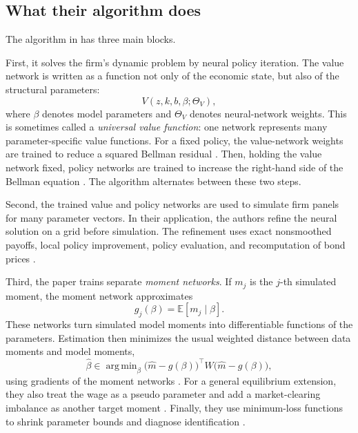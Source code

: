 \documentclass[11pt]{article}
\newcommand{\E}{\mathbb{E}}
\newcommand{\1}{\mathbf{1}}
\DeclareMathOperator*{\argmin}{arg\,min}
\begin{document}
\subsection{What their algorithm does}

The algorithm in \citet[Section 3]{duartefonseca2026ai} has three main blocks.

First, it solves the firm's dynamic problem by neural policy iteration. The
value network is written as a function not only of the economic state, but also
of the structural parameters:
\[
  V(z,k,b,\beta;\Theta_V),
\]
where \(\beta\) denotes model parameters and \(\Theta_V\) denotes neural-network
weights. This is sometimes called a \emph{universal value function}: one network
represents many parameter-specific value functions. For a fixed policy, the
value-network weights are trained to reduce a squared Bellman residual
\citep[Section 3.1.1 and eqs. (14)--(15)]{duartefonseca2026ai}. Then, holding the
value network fixed, policy networks are trained to increase the right-hand side
of the Bellman equation \citep[Section 3.1.2 and eqs. (16)--(17)]{duartefonseca2026ai}.
The algorithm alternates between these two steps.

Second, the trained value and policy networks are used to simulate firm panels
for many parameter vectors. In their application, the authors refine the neural
solution on a grid before simulation. The refinement uses exact nonsmoothed
payoffs, local policy improvement, policy evaluation, and recomputation of bond
prices \citep[Section 3.2.1 and Appendix A.5]{duartefonseca2026ai}.

Third, the paper trains separate \emph{moment networks}. If \(m_j\) is the
\(j\)-th simulated moment, the moment network approximates
\[
  g_j(\beta) = \E[m_j\mid \beta].
\]
These networks turn simulated model moments into differentiable functions of
the parameters. Estimation then minimizes the usual weighted distance between
data moments and model moments,
\begin{equation}
  \widehat\beta
  \in
  \argmin_\beta
  \bigl(\widehat m-g(\beta)\bigr)^\top
  W
  \bigl(\widehat m-g(\beta)\bigr),
  \label{eq:duarte-moment-objective}
\end{equation}
using gradients of the moment networks
\citep[Section 3.3 and eqs. (18)--(21)]{duartefonseca2026ai}. For a general
equilibrium extension, they also treat the wage as a pseudo parameter and add a
market-clearing imbalance as another target moment
\citep[Section 3.4]{duartefonseca2026ai}. Finally, they use minimum-loss
functions to shrink parameter bounds and diagnose identification
\citep[Sections 3.5--3.6]{duartefonseca2026ai}.
\end{document}
